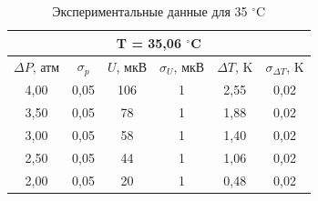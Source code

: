 \documentclass[a4paper, 12pt]{article}
\begin{document}
    \begin{table}[H]
	\centering
        \begin{tabular}{|cccccc|}
            \hline
            \multicolumn{6}{|c|}{T = 35,06 $^\circ$C} \\ \hline
            \multicolumn{1}{|c|}{$\Delta P$, атм} & \multicolumn{1}{c|}{$\sigma_p$} & \multicolumn{1}{c|}{$U$, мкВ} & \multicolumn{1}{c|}{$\sigma_U$, мкВ} & \multicolumn{1}{c|}{$\Delta T$, K} & $\sigma_{\Delta T}$, K \\ \hline
            \multicolumn{1}{|c|}{4,00} & \multicolumn{1}{c|}{0,05} & \multicolumn{1}{c|}{106} & \multicolumn{1}{c|}{1} & \multicolumn{1}{c|}{2,55} & 0,02 \\ \hline
            \multicolumn{1}{|c|}{3,50} & \multicolumn{1}{c|}{0,05} & \multicolumn{1}{c|}{78} & \multicolumn{1}{c|}{1} & \multicolumn{1}{c|}{1,88} & 0,02 \\ \hline
            \multicolumn{1}{|c|}{3,00} & \multicolumn{1}{c|}{0,05} & \multicolumn{1}{c|}{58} & \multicolumn{1}{c|}{1} & \multicolumn{1}{c|}{1,40} & 0,02 \\ \hline
            \multicolumn{1}{|c|}{2,50} & \multicolumn{1}{c|}{0,05} & \multicolumn{1}{c|}{44} & \multicolumn{1}{c|}{1} & \multicolumn{1}{c|}{1,06} & 0,02 \\ \hline
            \multicolumn{1}{|c|}{2,00} & \multicolumn{1}{c|}{0,05} & \multicolumn{1}{c|}{20} & \multicolumn{1}{c|}{1} & \multicolumn{1}{c|}{0,48} & 0,02 \\ \hline
        \end{tabular}
	\caption{Экспериментальные данные для 35 $^\circ$C}
	\label{tab:35C}
    \end{table}
\end{document}
